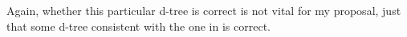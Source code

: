\documentclass[GPFinal]{subfiles}
\begin{document}
%
Again, whether this particular d-tree is correct is not vital for my proposal, just that some d-tree consistent with the one in \LLast is correct.

\end{document}
